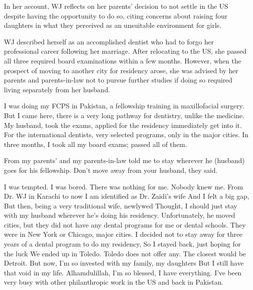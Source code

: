 In her account, WJ reflects on her parents’ decision to not settle in the US despite having the opportunity to do so, citing concerns about raising four daughters in what they perceived as an unsuitable environment for girls. 

WJ described herself as an accomplished dentist who had to forgo her professional career following her marriage. After relocating to the US, she passed all three required board examinations within a few months. However, when the prospect of moving to another city for residency arose, she was advised by her parents and parents-in-law not to pursue further studies if doing so required living separately from her husband. 


\begin{FoundPoem}
    
    I was doing my FCPS in Pakistan, a fellowship 		training in
    maxillofacial surgery. But 		I came here, there is a very long pathway
    for dentistry, unlike the medicine. 
     My husband,    took the exams,    applied for the residency
        immediately get into it. 	
        For the	                     international dentists,                       very selected
    programs, 		  only in the major cities.
        In three months, I took all my board exams;   passed all of them.
  
    From my parents’ and	 my parents-in-law	
    told me to stay wherever he (husband) goes for his fellowship. 
    Don’t move away from your husband, they said.

I was tempted. I was bored. There was nothing for me. Nobody knew me.
        From  
    Dr. WJ in Karachi to now I am identified as Dr. Zaidi’s wife 
    And I felt 			   a big gap,  
    But then, being a very traditional wife, newlywed
    Thought, I should just stay with my husband 
    wherever he’s doing his residency. 
    Unfortunately, he moved cities, but they did not have 
    any dental programs for me or dental schools. 
    They were in New York or Chicago, major cities. I decided not to stay away for
    three years of a dental program to do my residency, So I stayed back, just
    hoping for the luck 
    We ended up in Toledo. Toledo does not offer any. 
    The closest would be Detroit. 
    But now, I’m so invested with my family, my daughters 
    But
    I still have that void in my life. 
    Alhamdulillah,  				I’m so blessed,
        I have everything. 		 I’ve been very busy with other
        philanthropic work in the US and back in Pakistan.

\end{FoundPoem}

